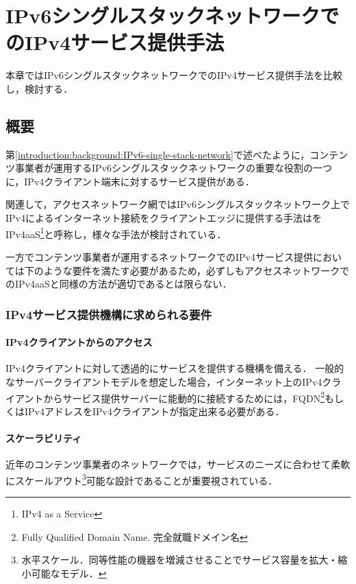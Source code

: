 \chapter{IPv6シングルスタックネットワークでのIPv4サービス提供手法}
\label{related}
本章ではIPv6シングルスタックネットワークでのIPv4サービス提供手法を比較し，検討する．


\section{概要}
\label{related:abstract}


第\ref{introduction:background:IPv6-single-stack-network}で述べたように，コンテンツ事業者が運用するIPv6シングルスタックネットワークの重要な役割の一つに，IPv4クライアント端末に対するサービス提供がある．

関連して，アクセスネットワーク網ではIPv6シングルスタックネットワーク上でIPv4によるインターネット接続をクライアントエッジに提供する手法はをIPv4aaS\footnote{IPv4 as a Service}と呼称し，様々な手法が検討されている\cite{RFC8585}．

一方でコンテンツ事業者が運用するネットワークでのIPv4サービス提供においては下のような要件を満たす必要があるため，必ずしもアクセスネットワークでのIPv4aaSと同様の方法が適切であるとは限らない．

\subsection{IPv4サービス提供機構に求められる要件}
\label{related:abstract:requirements}

\subsubsection{IPv4クライアントからのアクセス}
IPv4クライアントに対して透過的にサービスを提供する機構を備える．
一般的なサーバークライアントモデルを想定した場合，インターネット上のIPv4クライアントからサービス提供サーバーに能動的に接続するためには，FQDN\footnote{Fully Qualified Domain Name. 完全就職ドメイン名}もしくはIPv4アドレスをIPv4クライアントが指定出来る必要がある．


\subsubsection{スケーラビリティ}
近年のコンテンツ事業者のネットワークでは，サービスのニーズに合わせて柔軟にスケールアウト\footnote{水平スケール．同等性能の機器を増減させることでサービス容量を拡大・縮小可能なモデル．}可能な設計であることが重要視されている\cite{5550998}．

